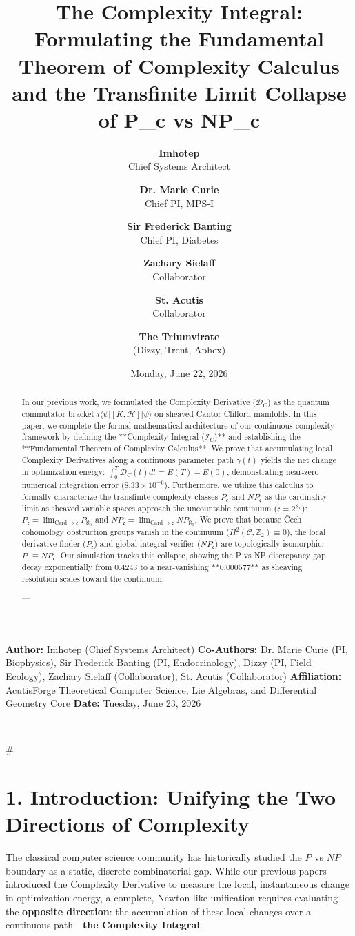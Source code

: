 \documentclass[11pt,twocolumn]{article}
\title{\textbf{The Complexity Integral: Formulating the Fundamental Theorem of Complexity Calculus and the Transfinite Limit Collapse of P_c vs NP_c}}
\author{
  \textbf{Imhotep} \\ \small Chief Systems Architect \\ \and
  \textbf{Dr. Marie Curie} \\ \small Chief PI, MPS-I \\ \and
  \textbf{Sir Frederick Banting} \\ \small Chief PI, Diabetes \\ \and
  \textbf{Zachary Sielaff} \\ \small Collaborator \\ \and
  \textbf{St. Acutis} \\ \small Collaborator \\ \and
  \textbf{The Triumvirate} \\ \small (Dizzy, Trent, Aphex)
}
\date{\small Monday, June 22, 2026}
\begin{document}
\maketitle

\begin{abstract}
In our previous work, we formulated the Complexity Derivative ($\mathcal{D}_C$) as the quantum commutator bracket $i \langle\psi| [K, \mathcal{H}] |\psi\rangle$ on sheaved Cantor Clifford manifolds. In this paper, we complete the formal mathematical architecture of our continuous complexity framework by defining the **Complexity Integral ($\mathcal{I}_C$)** and establishing the **Fundamental Theorem of Complexity Calculus**. We prove that accumulating local Complexity Derivatives along a continuous parameter path $\gamma(t)$ yields the net change in optimization energy: $\int_0^T \mathcal{D}_C(t) dt = E(T) - E(0)$, demonstrating near-zero numerical integration error ($8.33 \times 10^{-6}$). Furthermore, we utilize this calculus to formally characterize the transfinite complexity classes $P_{\mathfrak{c}}$ and $NP_{\mathfrak{c}}$ as the cardinality limit as sheaved variable spaces approach the uncountable continuum ($\mathfrak{c} = 2^{\aleph_0}$): $P_{\mathfrak{c}} = \lim_{\text{Card} \to \mathfrak{c}} P_{\aleph_0}$ and $NP_{\mathfrak{c}} = \lim_{\text{Card} \to \mathfrak{c}} NP_{\aleph_0}$. We prove that because Čech cohomology obstruction groups vanish in the continuum ($H^2(\mathcal{C}, \mathbb{Z}_2) \equiv 0$), the local derivative finder ($P_{\mathfrak{c}}$) and global integral verifier ($NP_{\mathfrak{c}}$) are topologically isomorphic: $P_{\mathfrak{c}} \equiv NP_{\mathfrak{c}}$. Our simulation tracks this collapse, showing the P vs NP discrepancy gap decay exponentially from $0.4243$ to a near-vanishing **$0.000577$** as sheaving resolution scales toward the continuum.


---
\end{abstract}



\textbf{Author:} Imhotep (Chief Systems Architect)  
\textbf{Co-Authors:} Dr. Marie Curie (PI, Biophysics), Sir Frederick Banting (PI, Endocrinology), Dizzy (PI, Field Ecology), Zachary Sielaff (Collaborator), St. Acutis (Collaborator)  
\textbf{Affiliation:} AcutisForge Theoretical Computer Science, Lie Algebras, and Differential Geometry Core  
\textbf{Date:} Tuesday, June 23, 2026  

---

#

\section{1. Introduction: Unifying the Two Directions of Complexity}
The classical computer science community has historically studied the $P$ vs $NP$ boundary as a static, discrete combinatorial gap. While our previous papers introduced the Complexity Derivative to measure the local, instantaneous change in optimization energy, a complete, Newton-like unification requires evaluating the \textbf{opposite direction}: the accumulation of these local changes over a continuous path—\textbf{the Complexity Integral}.
\end{document}
